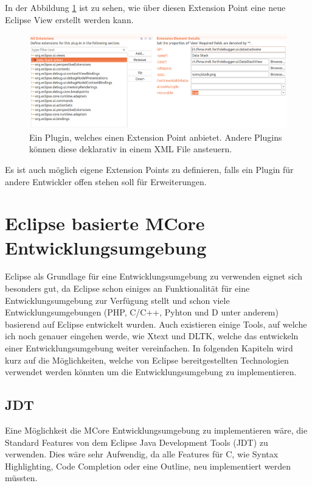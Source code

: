 \newpage
In der Abbildung \ref{fig:extensionpoint} ist zu sehen, wie über diesen Extension Point eine neue Eclipse View erstellt werden kann.
\begin{figure}[H]
	\centering
		\includegraphics[scale=0.25]{platform/extensionpoint2.png}
		\caption{Ein Plugin, welches einen Extension Point anbietet. Andere Plugins können diese deklarativ in einem XML File ansteuern.}
		\label{fig:extensionpoint}
\end{figure}

Es ist auch möglich eigene Extension Points zu definieren, falls ein Plugin für andere Entwickler offen stehen soll für Erweiterungen.

\section{Eclipse basierte MCore Entwicklungsumgebung}

Eclipse als Grundlage für eine Entwicklungsumgebung zu verwenden eignet sich besonders gut, da Eclipse schon einiges an Funktionalität für eine Entwicklungsumgebung zur Verfügung stellt und schon viele Entwicklungsumgebungen (PHP, C/C++, Pyhton und D unter anderem) basierend auf Eclipse entwickelt wurden. Auch existieren einige Tools, auf welche ich noch genauer eingehen werde, wie Xtext und DLTK, welche das entwickeln einer Entwicklungsumgebung weiter vereinfachen. In folgenden Kapiteln wird kurz auf die Möglichkeiten, welche von Eclipse bereitgestellten Technologien verwendet werden könnten um die Entwicklungsumgebung zu implementieren.

\subsection{JDT}
Eine Möglichkeit die MCore Entwicklungsumgebung zu implementieren wäre, die Standard Features von dem Eclipse Java Development Tools (JDT) zu verwenden. Dies wäre sehr Aufwendig, da alle Features für C, wie Syntax Highlighting, Code Completion oder eine Outline, neu implementiert werden müssten.


